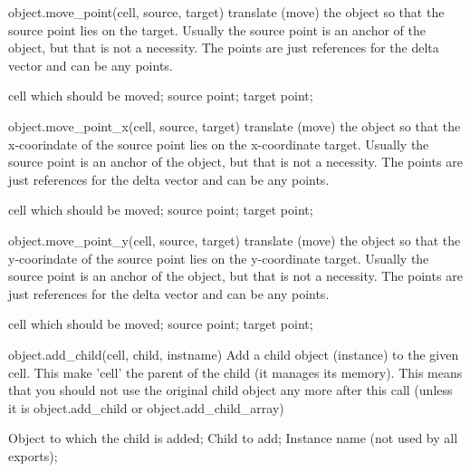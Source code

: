 \begin{APIfunc}{object.move\_point(cell, source, target)}
    translate (move) the object so that the source point lies on the target. Usually the source point is an anchor of the object, but that is not a necessity. The points are just references for the delta vector and can be any points.
    \begin{APIparameters}
            cell which should be moved;
            source point;
            target point;
    \end{APIparameters}
\end{APIfunc}
\begin{APIfunc}{object.move\_point\_x(cell, source, target)}
    translate (move) the object so that the x-coorindate of the source point lies on the x-coordinate target. Usually the source point is an anchor of the object, but that is not a necessity. The points are just references for the delta vector and can be any points.
    \begin{APIparameters}
            cell which should be moved;
            source point;
            target point;
    \end{APIparameters}
\end{APIfunc}
\begin{APIfunc}{object.move\_point\_y(cell, source, target)}
    translate (move) the object so that the y-coorindate of the source point lies on the y-coordinate target. Usually the source point is an anchor of the object, but that is not a necessity. The points are just references for the delta vector and can be any points.
    \begin{APIparameters}
            cell which should be moved;
            source point;
            target point;
    \end{APIparameters}
\end{APIfunc}
\begin{APIfunc}{object.add\_child(cell, child, instname)}
    Add a child object (instance) to the given cell. This make 'cell' the parent of the child (it manages its memory). This means that you should not use the original child object any more after this call (unless it is object.add\_child or object.add\_child\_array)
    \begin{APIparameters}
            Object to which the child is added;
            Child to add;
            Instance name (not used by all exports);
    \end{APIparameters}
\end{APIfunc}
